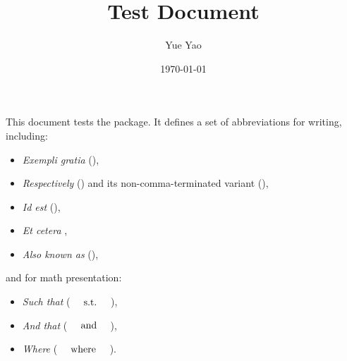 \documentclass[10pt]{article}
\title{\package Test Document}%
\author{Yue Yao}
\date{\today}
\begin{document}
\maketitle{}

This document tests the \package package. It defines a set of abbreviations for writing, 
including: 

\begin{itemize}
\item \emph{Exempli gratia} (\eg),
\item \emph{Respectively} (\resp) and its non-comma-terminated variant (\respb),
\item \emph{Id est} (\ie),
\item \emph{Et cetera} {\etc},
\item \emph{Also known as} (\aka),
\end{itemize}

and for math presentation: 

\begin{itemize}
\item \emph{Such that} ($\quad\text{~s.t.~}\quad$),
\item \emph{And that} ($\quad\text{~and~}\quad$),
\item \emph{Where} ($\quad\text{~where~}\quad$).
\end{itemize}
\end{document}
